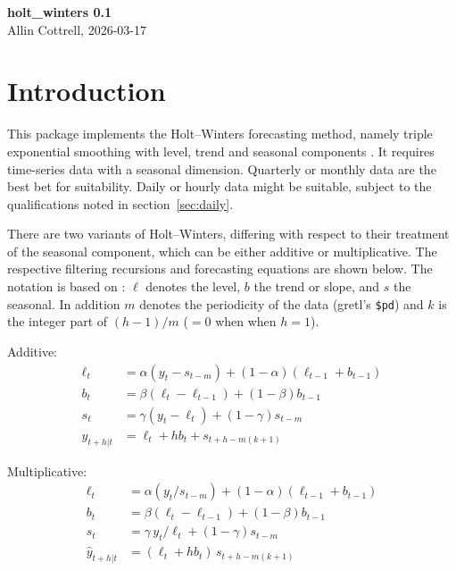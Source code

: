 \documentclass{article}
\begin{document}
\begin{center}
  {\Large \textbf{holt\_winters 0.1}} \\[6pt]
  Allin Cottrell, 2026-03-17
\end{center}

\section{Introduction}
\label{sec:intro}

This package implements the Holt--Winters forecasting method, namely
triple exponential smoothing with level, trend and seasonal components
\citep{holt57,winters60}.  It requires time-series data with a
seasonal dimension. Quarterly or monthly data are the best bet for
suitability. Daily or hourly data might be suitable, subject to the
qualifications noted in section~\ref{sec:daily}.

There are two variants of Holt--Winters, differing with respect to their
treatment of the seasonal component, which can be either additive or
multiplicative. The respective filtering recursions and forecasting
equations are shown below. The notation is based on \cite{hyndman2021}:
$\ell$ denotes the level, $b$ the trend or slope, and $s$ the seasonal.
In addition $m$ denotes the periodicity of the data (gretl's \verb|$pd|)
and $k$ is the integer part of $(h-1)/m$ ($=0$ when when $h=1$).

Additive:
\begin{align*}
  \ell_t &= \alpha (y_t - s_{t-m}) + (1-\alpha) (\ell_{t-1} + b_{t-1})\\
  b_t &= \beta (\ell_t - \ell_{t-1}) + (1-\beta) b_{t-1}\\
  s_t &= \gamma (y_t - \ell_t) + (1-\gamma) s_{t-m}\\
  \hat{y}_{t+h|t} &= \ell_t + hb_t + s_{t+h-m(k+1)}
\end{align*}

Multiplicative:
\begin{align*}
  \ell_t &= \alpha (y_t / s_{t-m}) + (1-\alpha) (\ell_{t-1} + b_{t-1})\\
  b_t &= \beta (\ell_t - \ell_{t-1}) + (1-\beta) b_{t-1}\\
  s_t &= \gamma\, y_t / \ell_t + (1-\gamma) s_{t-m}\\
  \hat{y}_{t+h|t} &= (\ell_t + hb_t)\, s_{t+h-m(k+1)}
\end{align*}
\end{document}
